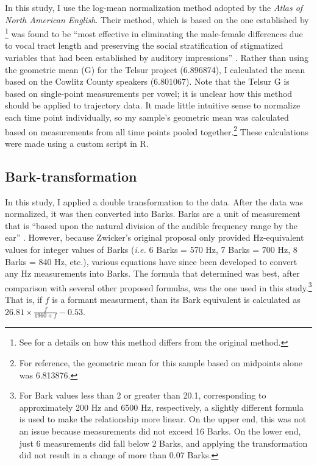 In this study, I use the log-mean normalization method adopted by the \textit{Atlas of North American English}. Their method, which is based on the one established by \citet{nearey_1978_diss}\footnote{See \citet[519 note 2]{barreda_nearey_2018} for a details on how this method differs from the original \citet{nearey_1978_diss} method.} was found to be ``most effective in eliminating the male-female differences due to vocal tract length and preserving the social stratification of stigmatized variables that had been established by auditory impressions'' \citep{labov_ash_boberg_2006_anae}. Rather than using the geometric mean (G) for the Telsur project (6.896874), I calculated the mean based on the Cowlitz County speakers (6.801067). Note that the Telsur G is based on single-point measurements per vowel; it is unclear how this method should be applied to trajectory data. It made little intuitive sense to normalize each time point individually, so my sample's geometric mean was calculated based on measurements from all time points pooled together.\footnote{For reference, the geometric mean for this sample based on midpoints alone was 6.813876.} These calculations were made using a custom script in R.


\subsection{Bark-transformation}
\label{sec:barks}

In this study, I applied a double transformation to the data. After the data was normalized, it was then converted into Barks. Barks are a unit of measurement that is ``based upon the natural division of the audible frequency range by the ear'' \citet[248]{zwicker_1961}. However, because Zwicker's original proposal only provided Hz-equivalent values for integer values of Barks (\textit{i.e.} 6 Barks = 570 Hz, 7 Barks = 700 Hz, 8 Barks = 840 Hz, etc.), various equations have since been developed to convert any Hz measurements into Barks. The formula that \citet{traunmuller_1990} determined was best, after comparison with several other proposed formulas, was the one used in this study.\footnote{For Bark values less than 2 or greater than 20.1, corresponding to approximately 200 Hz and 6500 Hz, respectively, a slightly different formula is used to make the relationship more linear. On the upper end, this was not an issue because measurements did not exceed 16 Barks. On the lower end, just 6 measurements did fall below 2 Barks, and applying the transformation did not result in a change of more than 0.07 Barks.} That is, if $f$ is a formant measurment, than its Bark equivalent is calculated as \(26.81 \times \frac{f}{1960+f} - 0.53\).

